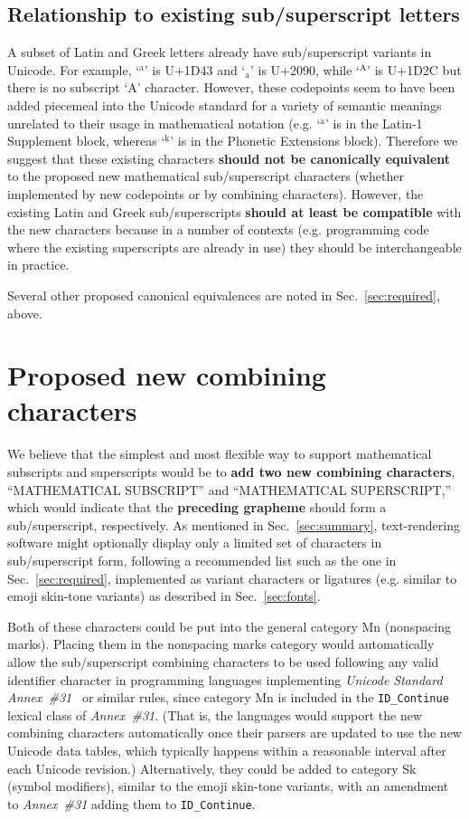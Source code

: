 \documentclass[10pt,english]{article}
\newcommand{\secref}[1]{Sec.~\ref{sec:#1}}
\begin{document}
\subsection{Relationship to existing sub/superscript letters}
\label{sec:existingchars}

A subset of Latin and Greek letters already have sub/superscript variants in Unicode.  For example, `$^\mathrm{a}$' is U+1D43 and `$_\mathrm{a}$' is U+2090, while `$^\mathrm{A}$' is U+1D2C but there is no subscript `A' character.   However, these codepoints seem to have been added piecemeal into the Unicode standard for a variety of semantic meanings unrelated to their usage in mathematical notation (e.g. `$^\mathrm{a}$' is in the Latin-1 Supplement block, whereas `$^\mathrm{k}$' is in the Phonetic Extensions block).  Therefore we suggest that these existing characters \textbf{should not be canonically equivalent} to the proposed new mathematical sub/superscript characters (whether implemented by new codepoints or by combining characters).   However, the existing Latin and Greek sub/superscripts \textbf{should at least be compatible} with the new characters because in a number of contexts (e.g. programming code where the existing superscripts are already in use) they should be interchangeable in practice.

Several other proposed canonical equivalences are noted in \secref{required}, above.

\section{Proposed new combining characters}

We believe that the simplest and most flexible way to support mathematical subscripts and superscripts would be to \textbf{add two new combining characters}, ``MATHEMATICAL SUBSCRIPT'' and ``MATHEMATICAL SUPERSCRIPT,'' which would indicate that the \textbf{preceding grapheme} should form a sub/superscript, respectively.   As mentioned in \secref{summary}, text-rendering software might optionally display only a limited set of characters in sub/superscript form, following a recommended list such as the one in \secref{required}, implemented as variant characters or ligatures (e.g. similar to emoji skin-tone variants) as described in \secref{fonts}.

Both of these characters could be put into the general category Mn (nonspacing marks). Placing them in the nonspacing marks category would automatically allow the sub/superscript combining characters to be used following any valid identifier character in programming languages implementing \emph{Unicode Standard Annex~\#31}~\cite{UAX31} or similar rules, since category Mn is included in the \texttt{ID\_Continue} lexical class of \emph{Annex~\#31}.  (That is, the languages would support the new combining characters automatically once their parsers are updated to use the new Unicode data tables, which typically happens within a reasonable interval after each Unicode revision.)   Alternatively, they could be added to category Sk (symbol modifiers), similar to the emoji skin-tone variants, with an amendment to \emph{Annex~\#31} adding them to \texttt{ID\_Continue}.
\end{document}
